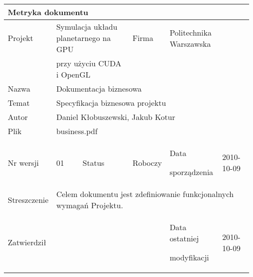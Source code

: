 \begin{tabular}{|p{2.5cm}|p{0.8cm}|p{2cm}|p{2cm}|p{3cm}|p{2cm}|}
	\hline
	\multicolumn{6}{|l|}{Metryka dokumentu} \\
	\hline
	Projekt & \multicolumn{2}{l|}{Symulacja układu planetarnego na GPU } &
	Firma & \multicolumn{2}{l|}{Politechnika Warszawska} \\
	&  \multicolumn{2}{l|}{przy użyciu CUDA i OpenGL} & &  \multicolumn{2}{l|}{} \\
	\hline
	Nazwa & \multicolumn{5}{l|}{Dokumentacja biznesowa} \\
	\hline
	Temat & \multicolumn{5}{l|}{Specyfikacja biznesowa projektu} \\
	\hline
	Autor & \multicolumn{5}{l|}{Daniel Kłobuszewski, Jakub Kotur} \\
	\hline
	Plik & \multicolumn{5}{l|}{business.pdf} \\
	\hline
	Nr wersji & 01 & Status & Roboczy & Data\par sporządzenia & 2010-10-09 \\
	\hline
	Streszczenie & \multicolumn{5}{p{11cm}|}{Celem dokumentu jest zdefiniowanie
		funkcjonalnych wymagań Projektu.} \\
	\hline
	Zatwierdził & \multicolumn{3}{l|}{ } &
	Data ostatniej\par modyfikacji & 2010-10-09 \\
	\hline
\end{tabular}

\newpage

